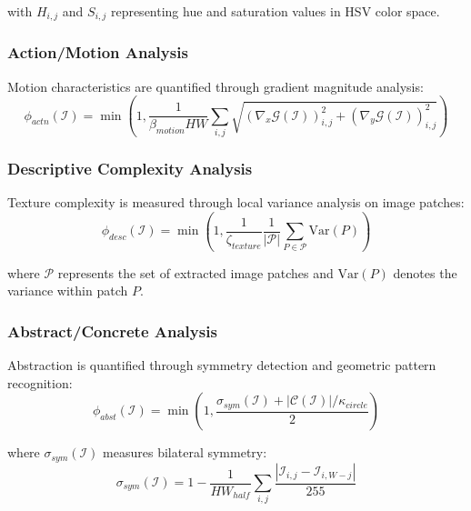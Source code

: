 with $H_{i,j}$ and $S_{i,j}$ representing hue and saturation values in HSV color space.

\subsubsection{Action/Motion Analysis}

Motion characteristics are quantified through gradient magnitude analysis:
\begin{equation}
\phi_{actn}(\mathcal{I}) = \min\left(1, \frac{1}{\beta_{motion}HW} \sum_{i,j} \sqrt{(\nabla_x \mathcal{G}(\mathcal{I}))_{i,j}^2 + (\nabla_y \mathcal{G}(\mathcal{I}))_{i,j}^2}\right)
\label{eq:action-measure}
\end{equation}

\subsubsection{Descriptive Complexity Analysis}

Texture complexity is measured through local variance analysis on image patches:
\begin{equation}
\phi_{desc}(\mathcal{I}) = \min\left(1, \frac{1}{\zeta_{texture}} \frac{1}{|\mathcal{P}|} \sum_{P \in \mathcal{P}} \text{Var}(P)\right)
\label{eq:descriptive-measure}
\end{equation}

where $\mathcal{P}$ represents the set of extracted image patches and $\text{Var}(P)$ denotes the variance within patch $P$.

\subsubsection{Abstract/Concrete Analysis}

Abstraction is quantified through symmetry detection and geometric pattern recognition:
\begin{equation}
\phi_{abst}(\mathcal{I}) = \min\left(1, \frac{\sigma_{sym}(\mathcal{I}) + |\mathcal{C}(\mathcal{I})|/\kappa_{circle}}{2}\right)
\label{eq:abstract-measure}
\end{equation}

where $\sigma_{sym}(\mathcal{I})$ measures bilateral symmetry:
\begin{equation}
\sigma_{sym}(\mathcal{I}) = 1 - \frac{1}{HW_{half}} \sum_{i,j} \frac{|\mathcal{I}_{i,j} - \mathcal{I}_{i,W-j}|}{255}
\label{eq:symmetry-measure}
\end{equation}

